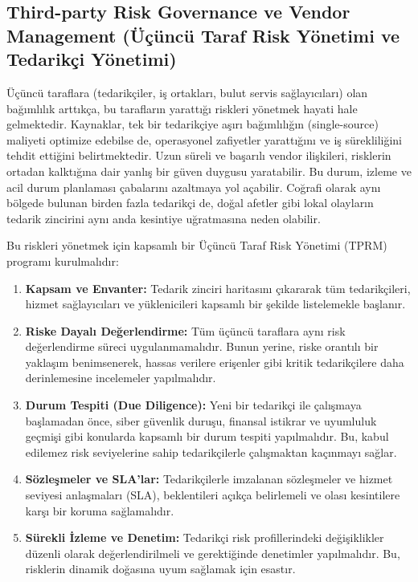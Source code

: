 \subsection{Third-party Risk Governance ve Vendor Management (Üçüncü Taraf Risk Yönetimi ve Tedarikçi Yönetimi)}

Üçüncü taraflara (tedarikçiler, iş ortakları, bulut servis sağlayıcıları) olan bağımlılık arttıkça, bu tarafların yarattığı riskleri yönetmek hayati hale gelmektedir. Kaynaklar, tek bir tedarikçiye aşırı bağımlılığın (single-source) maliyeti optimize edebilse de, operasyonel zafiyetler yarattığını ve iş sürekliliğini tehdit ettiğini belirtmektedir. Uzun süreli ve başarılı vendor ilişkileri, risklerin ortadan kalktığına dair yanlış bir güven duygusu yaratabilir. Bu durum, izleme ve acil durum planlaması çabalarını azaltmaya yol açabilir. Coğrafi olarak aynı bölgede bulunan birden fazla tedarikçi de, doğal afetler gibi lokal olayların tedarik zincirini aynı anda kesintiye uğratmasına neden olabilir.

Bu riskleri yönetmek için kapsamlı bir Üçüncü Taraf Risk Yönetimi (TPRM) programı kurulmalıdır:
\begin{enumerate}
    \item \textbf{Kapsam ve Envanter:} Tedarik zinciri haritasını çıkararak tüm tedarikçileri, hizmet sağlayıcıları ve yüklenicileri kapsamlı bir şekilde listelemekle başlanır.
    \item \textbf{Riske Dayalı Değerlendirme:} Tüm üçüncü taraflara aynı risk değerlendirme süreci uygulanmamalıdır. Bunun yerine, riske orantılı bir yaklaşım benimsenerek, hassas verilere erişenler gibi kritik tedarikçilere daha derinlemesine incelemeler yapılmalıdır.
    \item \textbf{Durum Tespiti (Due Diligence):} Yeni bir tedarikçi ile çalışmaya başlamadan önce, siber güvenlik duruşu, finansal istikrar ve uyumluluk geçmişi gibi konularda kapsamlı bir durum tespiti yapılmalıdır. Bu, kabul edilemez risk seviyelerine sahip tedarikçilerle çalışmaktan kaçınmayı sağlar.
    \item \textbf{Sözleşmeler ve SLA'lar:} Tedarikçilerle imzalanan sözleşmeler ve hizmet seviyesi anlaşmaları (SLA), beklentileri açıkça belirlemeli ve olası kesintilere karşı bir koruma sağlamalıdır.
    \item \textbf{Sürekli İzleme ve Denetim:} Tedarikçi risk profillerindeki değişiklikler düzenli olarak değerlendirilmeli ve gerektiğinde denetimler yapılmalıdır. Bu, risklerin dinamik doğasına uyum sağlamak için esastır.
\end{enumerate}

